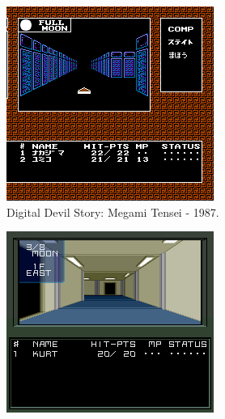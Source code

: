 \documentclass[
	12pt,				%
	openright,			%
	twoside,			%
	a4paper,			%
	english,			%
	french,				%
	spanish,			%
	brazil				%
	]{abntex2}
\begin{document}
\begin{figure}[h!]
  \centering
  \begin{subfigure}[b]{0.4\linewidth}
    \includegraphics[width=\linewidth]{mt.jpg}
     \caption{Digital Devil Story: Megami Tensei - 1987.}
  \end{subfigure}
  \begin{subfigure}[b]{0.4\linewidth}
    \includegraphics[width=\linewidth]{smt1.jpg}

\end{subfigure}
\end{figure}
\end{document}
